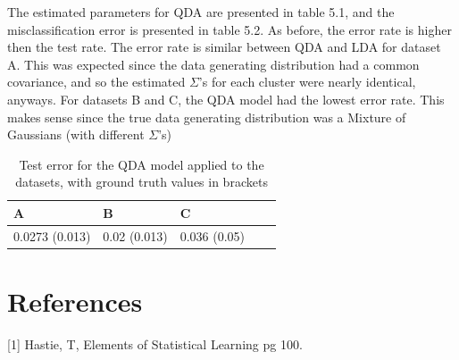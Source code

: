 \documentclass[paper=a4, fontsize=11pt]{scrartcl} %
\numberwithin{equation}{section} %
\numberwithin{figure}{section} %
\numberwithin{table}{section} %
\begin{document}
The estimated parameters for QDA are presented in table 5.1, and the misclassification error is presented in table 5.2.
As before, the error rate is higher then the test rate. The error rate is similar between QDA and LDA for dataset A. This was expected since the data generating distribution had a common covariance, and so the estimated \(\Sigma\)'s for each cluster were nearly identical, anyways. For datasets B and C, the QDA model had the lowest error rate. This makes sense since the true data generating distribution was a Mixture of Gaussians (with different \(\Sigma\)'s) 

	\begin{table}
		\caption {Test error for the QDA model applied to the datasets, with ground truth values in brackets} \label{tab:title} 
		\begin{center}		
			\begin{tabular}{*5l}   
				\toprule
				 A & B & C
				\\\midrule
				 0.0273 (0.013) & 0.02 (0.013) & 0.036 (0.05) \\\bottomrule
				\hline
			\end{tabular}
		\end{center}
	\end{table}

\newpage

\section{References}
[1] Hastie, T, Elements of Statistical Learning pg 100.
\end{document}
